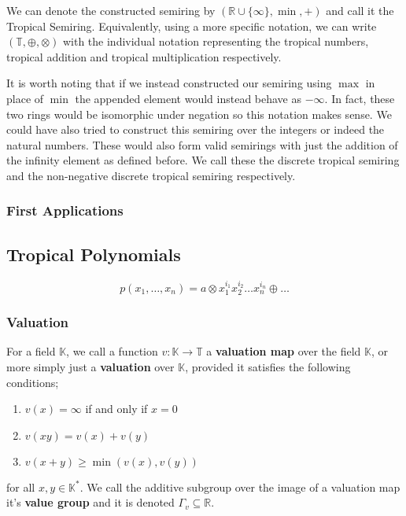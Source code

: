 \documentclass[12pt,a4paper]{amsart}
\newcommand{\R}{\mathbb{R}}
\newcommand{\T}{\mathbb{T}}
\newcommand{\K}{\mathbb{K}}
\theoremstyle{definition}
\theoremstyle{remark}
\begin{document}
We can denote the constructed semiring by $(\R\cup\{\infty\},\min,+)$ and call it the Tropical Semiring. Equivalently, using a more specific notation, we can write $(\T,\oplus,\otimes)$ with the individual notation representing the tropical numbers, tropical addition and tropical multiplication respectively.

It is worth noting that if we instead constructed our semiring using $\max$ in place of $\min$ the appended element would instead behave as $-\infty$. In fact, these two rings would be isomorphic under negation so this notation makes sense. We could have also tried to construct this semiring over the integers or indeed the natural numbers. These would also form valid semirings with just the addition of the infinity element as defined before. We call these the discrete tropical semiring and the non-negative discrete tropical semiring respectively.

\subsubsection{First Applications}

\subsection{Tropical Polynomials}

\begin{equation}
    p(x_1,\dots,x_n) = a\otimes x_1^{i_1}x_2^{i_2}\dots x_n^{i_n}\oplus\dots
\end{equation}

\subsubsection{Valuation}


For a field $\K$, we call a function $v:\K\to\T$ a \textbf{valuation map} over the field $\K$, or more simply just a \textbf{valuation} over $\K$, provided it satisfies the following conditions;
\begin{enumerate}
    \item $v(x) = \infty$ if and only if $x = 0$
    \item $v(xy) = v(x) + v(y)$
    \item $v(x+y) \geq \min( v(x),v(y) )$
\end{enumerate} for all $x,y\in \K^*$.
We call the additive subgroup over the image of a valuation map it's \textbf{value group} and it is denoted $\Gamma_v\subseteq\R$.
\end{document}
